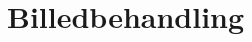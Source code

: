 \section{Billedbehandling}

\begin{comment}
\subsubsection*{Noter fra møde med Søren 20/2:}
identifikation: Se på en pixel, har naboer en kontrast farve?
En scan-linie: hvordan varierer kontrasten henover linien?
Adaboost - godt

\subsubsection*{Matriculas2003}
Bruger kun gråtone info. Arbejder også med nummerplader som skal være læsbar for det menneskelige øje.

Metode:
Histogram - først normaliseres billedet
Sobel filter - fremhæver ikke-homogene områder
"A simple threshold and a sub-sampling" bruges til at vælge områder der kan være nummerpladen

Husker alle områder som kan være nummerplader så de forkerte først vælges fra i genkendelses-fasen. Bruger multi-hypothesis detection (ikke forklaret yderligere i teksten).

Feature vektorer: hver pixel i et træningsbilleder er blevet klassificeret som positiv (del af nummerplade) eller negativ (ikke del af nummerplade). Minimerer efterfølgende det negative sæt.

Bruger kd-træ data struktur og en "omtrent nærmeste nabo" søgeteknik.

\subsubsection*{A Real-time vehicle License Plate Recognition (LPR) System på http://visl.technion.ac.il/projects/2003w24/}

* Find de gule (hos os: hvide) områder i billedet
* Forstør disse områder
* Find vinklen på nummerpladen ved brug af "Radon transform"
* Justering af nummerpladens konturer
* Unødvendige dele af billedet fjernes (kun nummerpladen tilbage)
* Billedet i gråtone, herefter gøres det binært
* Billedet normaliseres
* Tegn-inddeling vha. peak-to-valley

De brugte Matlab. De havde følgende relevante problemer og løsningsforslag til disse:


\end{comment}
